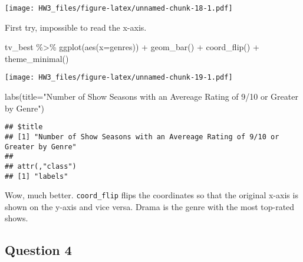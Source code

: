 \documentclass[
]{article}
\newenvironment{Shaded}{\begin{snugshade}}{\end{snugshade}}
\newcommand{\AttributeTok}[1]{\textcolor[rgb]{0.77,0.63,0.00}{#1}}
\newcommand{\FunctionTok}[1]{\textcolor[rgb]{0.00,0.00,0.00}{#1}}
\newcommand{\NormalTok}[1]{#1}
\newcommand{\SpecialCharTok}[1]{\textcolor[rgb]{0.00,0.00,0.00}{#1}}
\newcommand{\StringTok}[1]{\textcolor[rgb]{0.31,0.60,0.02}{#1}}
\begin{document}
\texttt{[image: HW3\_files/figure-latex/unnamed-chunk-18-1.pdf]}

First try, impossible to read the x-axis.

\begin{Shaded}
\begin{Highlighting}[]
\NormalTok{tv\_best }\SpecialCharTok{\%\textgreater{}\%} 
  \FunctionTok{ggplot}\NormalTok{(}\FunctionTok{aes}\NormalTok{(}\AttributeTok{x=}\NormalTok{genres)) }\SpecialCharTok{+}
  \FunctionTok{geom\_bar}\NormalTok{() }\SpecialCharTok{+}
  \FunctionTok{coord\_flip}\NormalTok{() }\SpecialCharTok{+} 
  \FunctionTok{theme\_minimal}\NormalTok{()}
\end{Highlighting}
\end{Shaded}

\texttt{[image: HW3\_files/figure-latex/unnamed-chunk-19-1.pdf]}

\begin{Shaded}
\begin{Highlighting}[]
  \FunctionTok{labs}\NormalTok{(}\AttributeTok{title=}\StringTok{"Number of Show Seasons with an Avereage Rating of 9/10 or Greater by Genre"}\NormalTok{)}
\end{Highlighting}
\end{Shaded}

\begin{verbatim}
## $title
## [1] "Number of Show Seasons with an Avereage Rating of 9/10 or Greater by Genre"
## 
## attr(,"class")
## [1] "labels"
\end{verbatim}

Wow, much better. \texttt{coord\_flip} flips the coordinates so that the
original x-axis is shown on the y-axis and vice versa. Drama is the
genre with the most top-rated shows.

\hypertarget{question-4-1}{%
\subsection{Question 4}\label{question-4-1}}
\end{document}
